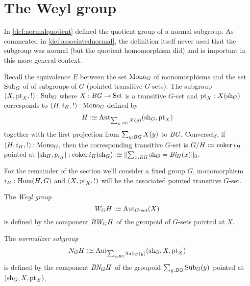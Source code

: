 \section{The Weyl group}
\label{sec:Weyl}

In \cref{def:normalquotient} defined the quotient group of a normal subgroup.
As commented in \cref{def:associatednormal}, the definition itself never used that the subgroup was normal (but the quotient homomorphism did) and is important in this more general context.

Recall the equivalence $E$ between the set $\mathrm{Mono}_G$ of monomorphisms and the set $\mathrm{Sub}_G$ of of subgroups of $G$ (pointed transitive $G$-sets): The subgroup $(X,\mathrm{pt}_X,!):\mathrm{Sub}_G$ where $X:\mathit{B}\mathit{G}\to\mathrm{Set}$ is a transitive $G$-set and $\mathrm{pt}_X:X(\mathrm{sh}_G)$ corresponds to $(H,i_H,!):\mathrm{Mono}_G$ defined by
$$H\defequi\aut_{\sum_{y:\BG}X(y)}(\sh_G,\pt_X)
$$ together with the first projection from $\sum_{y:\mathit{B}\mathit{G}}X(y)$ to $\mathit{B}\mathit{G}$.  Conversely, if $(H,i_H,!):\mathrm{Mono}_G$, then the corresponding transitive $G$-set is $G/H\defequi\coker i_H$ pointed at $|\sh_H,p_{i_H}|:\coker i_H(\sh_G)\defequi\Trunc{\sum_{x:\BH}\sh_G=\Bi_H(x)}_0$.

For the remainder of the section we'll consider a fixed group $G$, monomorphism $i_H:\Hom(H,G)$ and $(X,\mathrm{pt}_X,!)$ will be the associated pointed transitive $G$-set.
\begin{definition}

The \emph{Weyl group} \label{def:Weyl}
$$W_GH\defequi\Aut_{G\text{-set}}(X)$$ is defined by the component $\mathit{B}\mathit{W}_GH$ of the groupoid of $G$-sets pointed at $X$.

The \emph{normalizer subgroup} \label{def:normalizer}
$$N_GH\defequi\Aut_{\sum_{y:\BG}\typesubgroup_G(y)}(\sh_G,X,\pt_X)$$ is defined by the component $\mathit{B}\mathit{N}_GH$ of the groupoid $\sum_{y:\mathit{B}\mathit{G}}\mathrm{Sub}_G(y)$ pointed at $(\mathrm{sh}_G,X,\mathrm{pt}_X)$.
\end{definition}

